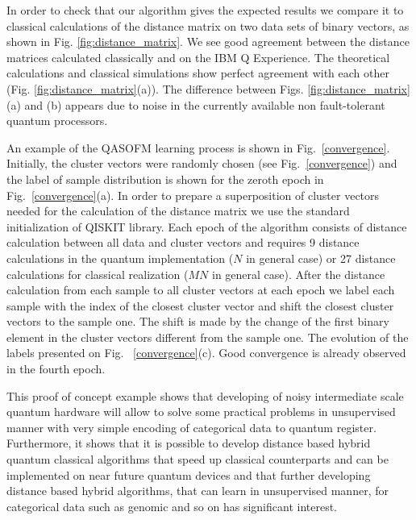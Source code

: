 \documentclass[pra,showkeys,twocolumn,showpacs]{revtex4-1}
\begin{document}
In order to check that our algorithm gives the expected results we compare it to classical calculations of the distance matrix on two data sets of binary vectors, as shown in Fig. \ref{fig:distance_matrix}.  
We see good agreement between the distance matrices calculated classically and on the IBM Q Experience. 
The theoretical calculations and classical simulations show perfect agreement with each other (Fig. \ref{fig:distance_matrix}(a)). 
The difference between Figs. \ref{fig:distance_matrix} (a) and (b) appears due to noise in the currently available non fault-tolerant quantum processors.

An example of the QASOFM learning process is shown in Fig.~\ref{convergence}. 
Initially, the cluster vectors were randomly chosen (see Fig.~\ref{convergence}) 
and the label of sample distribution is shown for the zeroth epoch in Fig.~\ref{convergence}(a). In order to prepare a superposition of cluster vectors needed for the calculation of the distance matrix we use the standard initialization of QISKIT library. 
Each epoch of the algorithm consists of distance calculation between all data and cluster vectors 
and requires 9 distance calculations in the  quantum implementation ($N$ in general case) 
or 27 distance calculations for classical realization 
($MN$ in general case). 
After the distance calculation from each sample to all cluster vectors at each epoch we label each sample with the index of the closest cluster vector 
and shift the closest cluster vectors to the sample one. 
The shift is made by the change of the first binary element in the cluster vectors different from the sample one. 
The evolution of the labels presented on Fig. ~\ref{convergence}(c).  
Good convergence is already observed in the fourth epoch.

This proof of concept example shows that developing of noisy intermediate scale quantum hardware will allow to solve some practical problems in unsupervised manner with very simple encoding of categorical data to quantum register. 
Furthermore, it shows that it is possible to develop distance based hybrid quantum classical algorithms 
that speed up classical counterparts and can be implemented on near future quantum devices 
and that further developing distance based hybrid algorithms, 
that can learn in unsupervised manner, for categorical data such as genomic and so on has significant interest.
\end{document}
